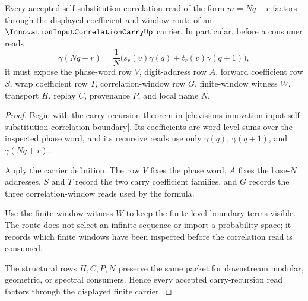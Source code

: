 \begin{theorem}
\label{thm:innovation-input-correlation-carry-recursion-route}
Every accepted self-substitution correlation read of the form $m=Nq+r$ factors through the displayed coefficient and window route of an $\InnovationInputCorrelationCarryUp$ carrier. In particular, before a consumer reads
$$
\gamma(Nq+r)
=
\frac1N
\bigl(s_r(v)\gamma(q)+t_r(v)\gamma(q+1)\bigr),
$$
it must expose the phase-word row $V$, digit-address row $A$, forward coefficient row $S$, wrap coefficient row $T$, correlation-window row $G$, finite-window witness $W$, transport $H$, replay $C$, provenance $P$, and local name $N$.
\end{theorem}
\begin{proof}
Begin with the carry recursion theorem in \autoref{ch:visions-innovation-input-self-substitution-correlation-boundary}. Its coefficients are word-level sums over the inspected phase word, and its recursive reads use only $\gamma(q)$, $\gamma(q+1)$, and $\gamma(Nq+r)$.

Apply the carrier definition. The row $V$ fixes the phase word, $A$ fixes the base-$N$ addresses, $S$ and $T$ record the two carry coefficient families, and $G$ records the three correlation-window reads used by the formula.

Use the finite-window witness $W$ to keep the finite-level boundary terms visible. The route does not select an infinite sequence or import a probability space; it records which finite windows have been inspected before the correlation read is consumed.

The structural rows $H,C,P,N$ preserve the same packet for downstream modular, geometric, or spectral consumers. Hence every accepted carry-recursion read factors through the displayed finite carrier.
\end{proof}



